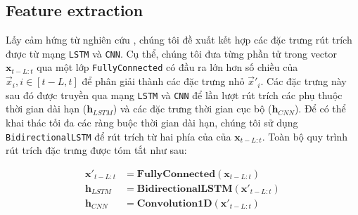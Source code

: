 \documentclass[aps,prb,groupedaddress,twocolumn,showpacs,dvipdfmx,superscriptaddress,pdftex]{revtex4-2}
\begin{document}


\subsection{Feature extraction}

Lấy cảm hứng từ nghiên cứu \cite{vo2017multi}, chúng tôi đề xuất kết hợp các đặc trưng rút trích được từ mạng \verb|LSTM| và \verb|CNN|. Cụ thể, chúng tôi đưa từng phần tử trong vector $\mathbf{x}_{t-L:t}$ qua một lớp \verb|FullyConnected| có đầu ra lớn hơn số chiều của $\vec x_i, i\in[t-L, t]$ để phân giải thành các đặc trưng nhỏ $\vec x'_i$. Các đặc trưng này sau đó được truyền qua mạng \verb|LSTM| và \verb|CNN| để lần lượt rút trích các phụ thuộc thời gian dài hạn ($\mathbf{h}_{LSTM}$) và các đặc trưng thời gian cục bộ ($\mathbf{h}_{CNN}$). Để có thể khai thác tối đa các ràng buộc thời gian dài hạn, chúng tôi sử dụng \verb|BidirectionalLSTM| để rút trích từ hai phía của của $\mathbf{x}_{t-L:t}$. Toàn bộ quy trình rút trích đặc trưng được tóm tắt như sau:


\begin{align}
    \mathbf{x'}_{t-L:t} &= \mathbf{FullyConnected}\left( \mathbf{x}_{t-L:t} \right)\\
    \mathbf{h}_{LSTM} &= \mathbf{BidirectionalLSTM}\left( \mathbf{x'}_{t-L:t} \right)\\
    \mathbf{h}_{CNN} &= \mathbf{Convolution1D}\left( \mathbf{x'}_{t-L:t} \right)
    \label{eq:feature}
\end{align}
\end{document}
